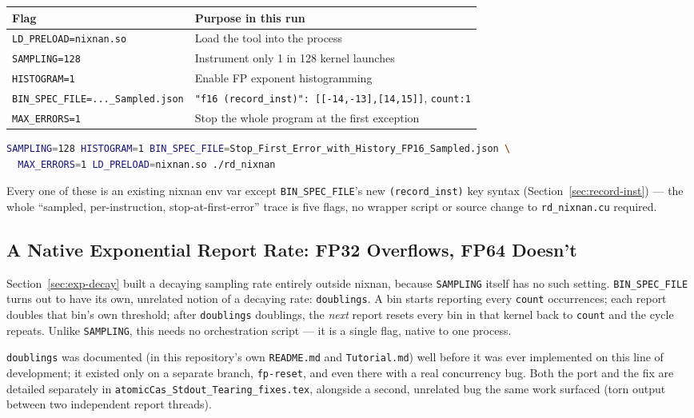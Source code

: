 \documentclass[11pt]{article}
\begin{document}
\begin{center}
\begin{tabular}{ll}
\toprule
Flag & Purpose in this run \\
\midrule
\texttt{LD\_PRELOAD=nixnan.so} & Load the tool into the process \\
\texttt{SAMPLING=128} & Instrument only 1 in 128 kernel launches \\
\texttt{HISTOGRAM=1} & Enable FP exponent histogramming \\
\texttt{BIN\_SPEC\_FILE=...\_Sampled.json} & \texttt{"f16 (record\_inst)": [[-14,-13],[14,15]]}, \texttt{count:1} \\
\texttt{MAX\_ERRORS=1} & Stop the whole program at the first exception \\
\bottomrule
\end{tabular}
\end{center}
\begin{lstlisting}[language=bash]
SAMPLING=128 HISTOGRAM=1 BIN_SPEC_FILE=Stop_First_Error_with_History_FP16_Sampled.json \
  MAX_ERRORS=1 LD_PRELOAD=nixnan.so ./rd_nixnan
\end{lstlisting}
Every one of these is an existing nixnan env var except \texttt{BIN\_SPEC\_FILE}'s new
\texttt{(record\_inst)} key syntax (Section~\ref{sec:record-inst}) --- the whole
``sampled, per-instruction, stop-at-first-error'' trace is five flags, no wrapper script
or source change to \texttt{rd\_nixnan.cu} required.

\subsection{A Native Exponential Report Rate: FP32 Overflows, FP64 Doesn't}
\label{sec:fp32-doubling}

Section~\ref{sec:exp-decay} built a decaying sampling rate entirely outside nixnan,
because \texttt{SAMPLING} itself has no such setting. \texttt{BIN\_SPEC\_FILE} turns out
to have its own, unrelated notion of a decaying rate: \texttt{doublings}. A bin starts
reporting every \texttt{count} occurrences; each report doubles that bin's own
threshold; after \texttt{doublings} doublings, the \emph{next} report resets every bin
in that kernel back to \texttt{count} and the cycle repeats. Unlike
\texttt{SAMPLING}, this needs no orchestration script --- it is a single flag, native to
one process.

\texttt{doublings} was documented (in this repository's own \texttt{README.md} and
\texttt{Tutorial.md}) well before it was ever implemented on this line of development;
it existed only on a separate branch, \texttt{fp-reset}, and even there with a real
concurrency bug. Both the port and the fix are detailed separately in
\texttt{atomicCas\_Stdout\_Tearing\_fixes.tex}, alongside a second, unrelated bug the
same work surfaced (torn output between two independent report threads).
\end{document}

